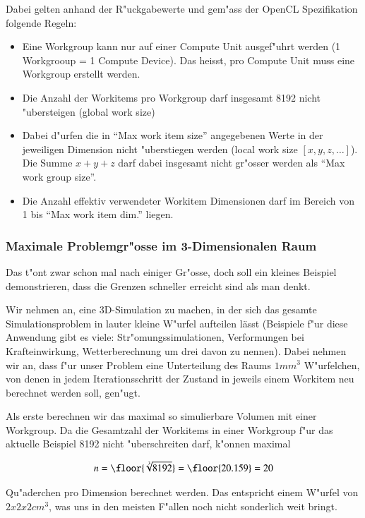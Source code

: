 \begin{refsection}
\begin{description}
\end{description}


\noindent Dabei gelten anhand der R"uckgabewerte und gem"ass der OpenCL
Spezifikation\cite{crypto:opencl_ref} folgende Regeln:

\begin{itemize}
 \item Eine Workgroup kann nur auf einer Compute Unit ausgef"uhrt werden (1 Workgrooup = 1 
       Compute Device). Das heisst, pro Compute Unit muss eine Workgroup erstellt werden.
 \item Die Anzahl der Workitems pro Workgroup darf insgesamt 8192 nicht "ubersteigen (global work size)
 \item Dabei d"urfen die in ``Max work item size'' angegebenen Werte in der jeweiligen 
       Dimension nicht "uberstiegen werden (local work size $[x,y,z,\ldots]$).
			 Die Summe $x + y + z$ darf dabei insgesamt nicht gr"osser werden als ``Max work group size''.
 \item Die Anzahl effektiv verwendeter Workitem Dimensionen darf im Bereich von 1 bis
       ``Max work item dim.'' liegen.
\end{itemize}


\subsubsection {Maximale Problemgr"osse im 3-Dimensionalen Raum}

Das t"ont zwar schon mal nach einiger Gr"osse, doch soll ein kleines Beispiel
demonstrieren, dass die Grenzen schneller erreicht sind als man denkt.

Wir nehmen an, eine 3D-Simulation zu machen, in der sich das gesamte
Simulationsproblem in lauter kleine W"urfel aufteilen lässt (Beispiele f"ur diese
Anwendung gibt es viele: Str"omungssimulationen, Verformungen bei Krafteinwirkung,
Wetterberechnung um drei davon zu nennen). Dabei nehmen wir an, dass f"ur unser 
Problem eine Unterteilung des Raums $1 mm^{3}$ W"urfelchen, von denen in jedem 
Iterationsschritt der Zustand in jeweils einem Workitem neu berechnet werden soll, 
gen"ugt.

Als erste berechnen wir das maximal so simulierbare Volumen mit einer Workgroup.
Da die Gesamtzahl der Workitems in einer Workgroup f"ur das aktuelle Beispiel
8192 nicht "uberschreiten darf, k"onnen maximal

\[
 n = \floor{\sqrt[3]{8192}} = \floor{20.159} = 20
\]

Qu"aderchen pro Dimension berechnet werden. Das entspricht einem W"urfel von 
$2x2x2 cm^{3}$, was uns in den meisten F"allen noch nicht sonderlich weit bringt.


\end{refsection}
